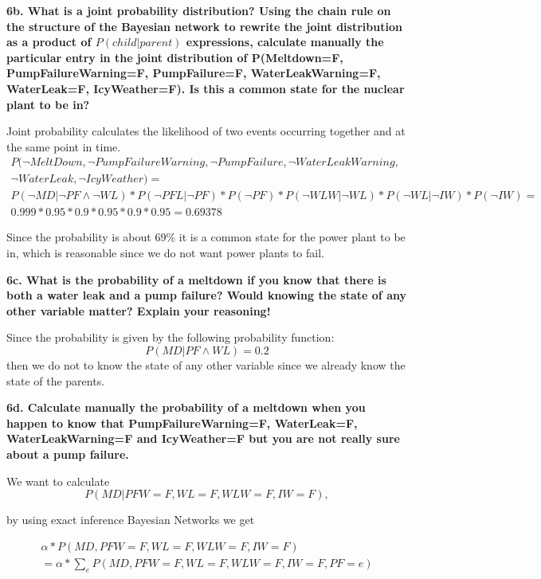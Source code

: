 \documentclass[a4paper,10pt]{article}
\begin{document}
\textbf{6b. What is a joint probability distribution? 
Using the chain rule on the structure of the Bayesian network to rewrite the joint distribution as a product of 
$P(child|parent)$ expressions, calculate manually the particular entry in the joint distribution of 
P(Meltdown=F, PumpFailureWarning=F, PumpFailure=F, WaterLeakWarning=F, WaterLeak=F, IcyWeather=F). 
Is this a common state for the nuclear plant to be in?}

Joint probability calculates the likelihood of two events occurring together and at the same point in time. 
\begin{multline*}
	P(\neg MeltDown, \neg PumpFailureWarning, \neg PumpFailure, \neg WaterLeakWarning, \\ \neg WaterLeak, \neg IcyWeather) = \\
	P(\neg MD | \neg PF \wedge \neg WL) * P(\neg PFL | \neg PF) * P(\neg PF) * P(\neg WLW | \neg WL) * P(\neg WL | \neg IW) * P(\neg IW) = \\
	0.999 * 0.95 * 0.9 * 0.95 * 0.9 * 0.95 = 0.69378
\end{multline*}

Since the probability is about 69\% it is a common state for the power plant to be in,
which is reasonable since we do not want power plants to fail.

\textbf{6c. What is the probability of a meltdown if you know that there is both a water leak and a pump failure? 
Would knowing the state of any other variable matter? 
Explain your reasoning!}

Since the probability is given by the following probability function:
\begin{equation*}
	P(MD | PF \wedge WL) = 0.2
\end{equation*}
then we do not to know the state of any other variable since we already know the state of
the parents.

\textbf{6d. Calculate manually the probability of a meltdown when you happen to know that 
PumpFailureWarning=F, WaterLeak=F, WaterLeakWarning=F and IcyWeather=F but you are not really sure about a pump failure.}

We want to calculate
\begin{equation*}
	P(MD | PFW = F, WL = F, WLW = F, IW = F),
\end{equation*}

by using exact inference Bayesian Networks we get

\begin{multline*}
	\alpha * P(MD, PFW = F, WL = F, WLW = F, IW = F) \\ = \alpha * \sum_e P(MD, PFW = F, WL = F, WLW = F, IW = F, PF = e)
\end{multline*}
\end{document}
